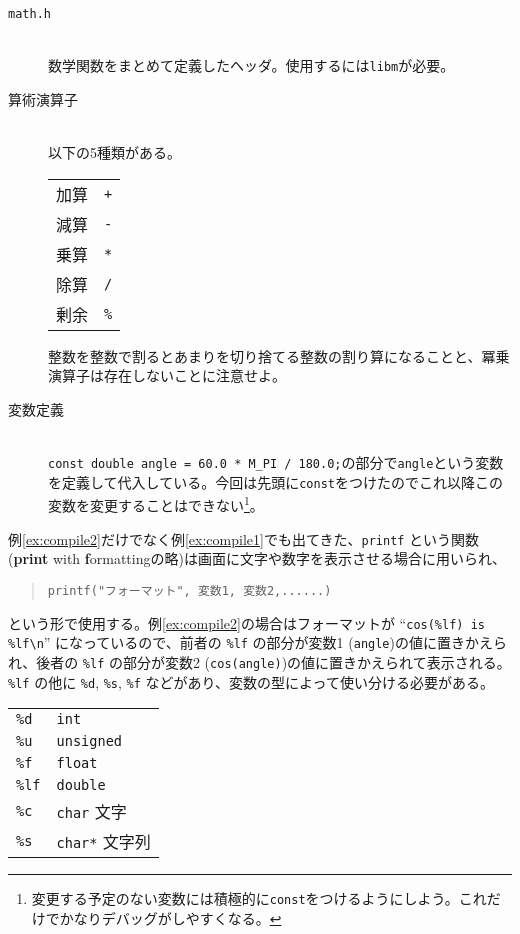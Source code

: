 \begin{description}
    \item[\texttt{math.h}] \mbox{}\\
          数学関数をまとめて定義したヘッダ。使用するには\texttt{libm}が必要。
    \item[算術演算子] \mbox{} \\
          以下の5種類がある。
          \begin{table}[H]
              \centering
              \begin{tabular}{ll}
                  加算 & \texttt{+}  \\
                  減算 & \texttt{-}  \\
                  乗算 & \texttt{*}  \\
                  除算 & \texttt{/}  \\
                  剰余 & \texttt{\%}
              \end{tabular}
          \end{table} \noindent
          整数を整数で割るとあまりを切り捨てる整数の割り算になることと、冪乗演算子は存在しないことに注意せよ。
    \item[変数定義] \mbox{}\\
          \texttt{const double angle = 60.0 * M\_PI / 180.0;}の部分で\texttt{angle}という変数を定義して代入している。今回は先頭に\texttt{const}をつけたのでこれ以降この変数を変更することはできない\footnote{変更する予定のない変数には積極的に\texttt{const}をつけるようにしよう。これだけでかなりデバッグがしやすくなる。}。
\end{description}
例\ref{ex:compile2}だけでなく例\ref{ex:compile1}でも出てきた、\texttt{printf} という関数(\textbf{print} with \textbf{f}ormattingの略)は画面に文字や数字を表示させる場合に用いられ、
\begin{quote}
    \begin{verbatim}
printf("フォーマット", 変数1, 変数2,......)
\end{verbatim}
\end{quote}
という形で使用する。例\ref{ex:compile2}の場合はフォーマットが ``\texttt{cos(\%lf) is \%lf\textbackslash n}'' になっているので、前者の \texttt{\%lf} の部分が変数1 (\texttt{angle})の値に置きかえられ、後者の \texttt{\%lf} の部分が変数2 (\texttt{cos(angle)})の値に置きかえられて表示される。\texttt{\%lf} の他に \texttt{\%d}, \texttt{\%s}, \texttt{\%f} などがあり、変数の型によって使い分ける必要がある。
\begin{table}[H]
    \centering
    \begin{tabular}{ll}
        \texttt{\%d}  & \texttt{int}          \\
        \texttt{\%u}  & \texttt{unsigned}     \\
        \texttt{\%f}  & \texttt{float}        \\
        \texttt{\%lf} & \texttt{double}       \\
        \texttt{\%c}  & \texttt{char} 文字    \\
        \texttt{\%s}  & \texttt{char*} 文字列
    \end{tabular}
\end{table}
